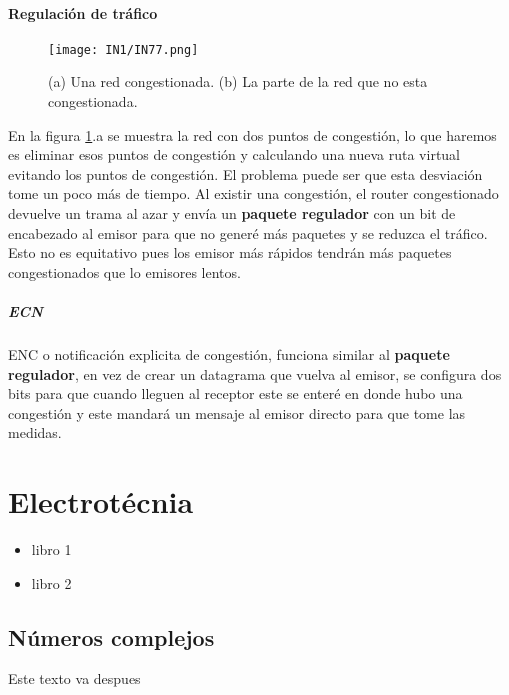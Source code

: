 \documentclass[12pt,fleqn,a4paper,oneside]{LegrandOrangeBook}
\begin{document}
\subsection{Regulación de tráfico}
\begin{figure}[H]
\centering
\texttt{[image: IN1/IN77.png]}
\caption{(a) Una red congestionada. (b) La parte de la red que no esta congestionada.}
\label{fig:regulacion trafico}
\end{figure}
En la figura \ref{fig:regulacion trafico}.a se muestra la red con dos puntos de congestión, lo que haremos es eliminar esos puntos de congestión y calculando una nueva ruta virtual evitando los puntos de congestión. El problema puede ser que esta desviación tome un poco más de tiempo. Al existir una congestión, el router congestionado devuelve un trama al azar y envía un \textbf{paquete regulador} con un bit de encabezado al emisor para que no generé más paquetes y se reduzca el tráfico. Esto no es equitativo pues los emisor más rápidos tendrán más paquetes congestionados que lo emisores lentos.
\subsubsection{ECN}
ENC o notificación explicita de congestión, funciona similar al \textbf{paquete regulador}, en vez de crear un datagrama que vuelva al emisor, se configura dos bits para que cuando lleguen al receptor este se enteré en donde hubo una congestión y este mandará un mensaje al emisor directo para que tome las medidas.

\part{Electrotécnia}
\begin{itemize}
\item libro 1
\item libro 2
\end{itemize}
\chapter{Números complejos}
Este texto va despues
\end{document}
